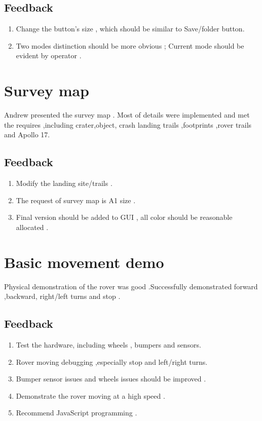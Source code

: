 \documentclass{article}
\begin{document}
\subsection{Feedback}
\begin{enumerate}
\item Change the button's size , which should be similar to Save/folder button.  
\item Two modes distinction should be more obvious ; Current mode should be evident by operator .
\end{enumerate}

\section{Survey map}
Andrew presented the survey map . Most of details were implemented and met the requires ,including crater,object, crash landing trails ,footprints ,rover trails and Apollo 17. 
\subsection{Feedback}
\begin{enumerate}
\item Modify the landing site/trails .
\item The request of survey map is A1 size .
\item Final version should be added to GUI , all color should be reasonable allocated .
\end{enumerate}

\section{Basic movement demo}
Physical demonstration of the rover was good .Successfully demonstrated forward ,backward, right/left turns and stop .
\subsection{Feedback}
\begin{enumerate}
\item Test the hardware, including wheels , bumpers and sensors.
\item Rover moving debugging ,especially stop and left/right turns.
\item Bumper sensor issues and wheels issues should be improved .
\item Demonstrate the rover moving at a high speed .
\item Recommend JavaScript programming .  
\end{enumerate}
\end{document}
